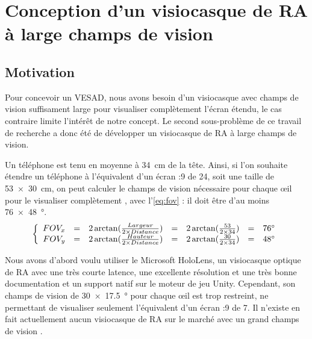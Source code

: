\chapter{Conception d'un visiocasque de RA à large champs de vision}
\label{ch:methodology}

\section{Motivation}
Pour concevoir un VESAD, nous avons besoin d'un visiocasque avec champs de vision suffisament large pour visualiser complètement l'écran étendu, le cas contraire limite l'intérêt de notre concept. Le second sous-problème de ce travail de recherche a donc été de développer un visiocasque de RA à large champs de vision.

Un téléphone est tenu en moyenne à \SI{34}{\cm} \citep{Bababekova2011} de la tête. Ainsi, si l'on souhaite étendre un téléphone à l'équivalent d'un écran {:9} de \SI{24}{\inch}, soit une taille de \SI{53x30}{\cm}, on peut calculer le champs de vision nécessaire pour chaque \oe il pour le visualiser complètement , avec l'\autoref{eq:fov} : il doit être d'au moins \SI{76x48}{\degree}.
\begin{equation}
  \label{eq:fov}
  \left \{
  \begin{array}{r c c c c c l}
    FOV_x & = & 2 \arctan (\frac{Largeur}{2 \times Distance}) & = & 2 \arctan (\frac{53}{2 \times 34}) & = & \ang{76}\\
    FOV_y & = & 2 \arctan (\frac{Hauteur}{2 \times Distance}) & = & 2 \arctan (\frac{30}{2 \times 34}) & = & \ang{48}
  \end{array}
  \right .
\end{equation}


Nous avons d'abord voulu utiliser le Microsoft HoloLens, un visiocasque optique de RA avec une très courte latence, une excellente résolution et une très bonne documentation et un support natif sur le moteur de jeu Unity. Cependant, son champs de vision de \SI{30x17.5}{\degree} pour chaque \oe il \citep{Kreylos2015} est trop restreint, ne permettant de visualiser seulement l'équivalent d'un écran {:9} de \SI{7}{\inch}. Il n'existe en fait actuellement aucun visiocasque de RA sur le marché avec un grand champs de vision \citep{Millette2016}.


